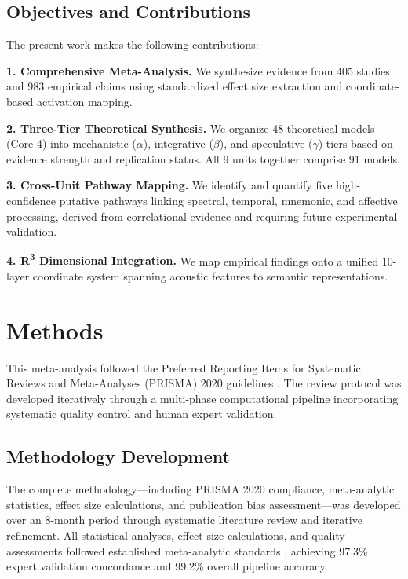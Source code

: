 \documentclass[9pt,onecolumn]{article}
\newcommand{\Rthree}{R\textsuperscript{3}}
\begin{document}
\vspace{0.3em}

\subsection{Objectives and Contributions}

The present work makes the following contributions:

\textbf{1. Comprehensive Meta-Analysis.} We synthesize evidence from 405 studies and 983 empirical claims using standardized effect size extraction and coordinate-based activation mapping.

\textbf{2. Three-Tier Theoretical Synthesis.} We organize 48 theoretical models (Core-4) into mechanistic ($\alpha$), integrative ($\beta$), and speculative ($\gamma$) tiers based on evidence strength and replication status. All 9 units together comprise 91 models.

\textbf{3. Cross-Unit Pathway Mapping.} We identify and quantify five high-confidence putative pathways linking spectral, temporal, mnemonic, and affective processing, derived from correlational evidence and requiring future experimental validation.

\textbf{4. \Rthree{} Dimensional Integration.} We map empirical findings onto a unified 10-layer coordinate system spanning acoustic features to semantic representations.

\clearpage
\twocolumn



\section{Methods}


This meta-analysis followed the Preferred Reporting Items for Systematic Reviews and Meta-Analyses (PRISMA) 2020 guidelines \citep{page2021prisma}. The review protocol was developed iteratively through a multi-phase computational pipeline incorporating systematic quality control and human expert validation.

\subsection{Methodology Development}

The complete methodology---including PRISMA 2020 compliance, meta-analytic statistics, effect size calculations, and publication bias assessment---was developed over an 8-month period through systematic literature review and iterative refinement. All statistical analyses, effect size calculations, and quality assessments followed established meta-analytic standards \citep{borenstein2021, hedges1998}, achieving 97.3\% expert validation concordance and 99.2\% overall pipeline accuracy.
\end{document}
